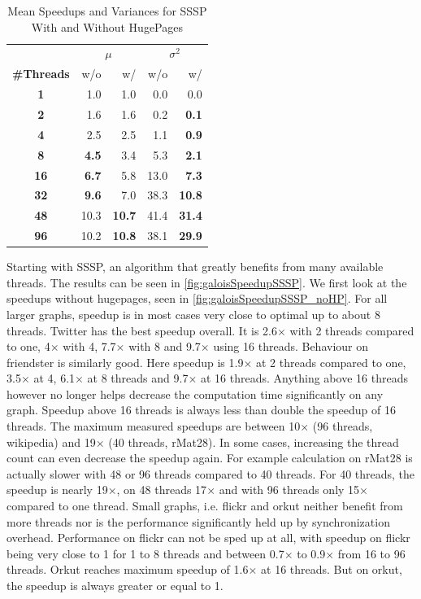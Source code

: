 \begin{table}
\renewcommand{\arraystretch}{1.3}
\centering
\caption{Mean Speedups and Variances for SSSP With and Without HugePages}
\label{tbl:ssspMeansVariances}
\begin{tabular}{c
r@{\tabskip 1 \tabcolsep}r
r@{\tabskip 1 \tabcolsep}r}
\toprule
&\multicolumn{2}{c}{\!\!\!$\mu$}&\multicolumn{2}{c}{\!\!$\sigma^2$}\\
\cmidrule(r){2-3}\cmidrule(r){4-5}
{\bf\#Threads}&w/o&w/&w/o&w/\\\midrule
\bf1 & 1.0 & 1.0 & 0.0 & 0.0 \\
\bf2 & 1.6 & 1.6 & 0.2 & \bf 0.1 \\
\bf4 & 2.5 & 2.5 & 1.1 & \bf 0.9 \\
\bf8 & \bf 4.5 & 3.4 & 5.3 & \bf 2.1 \\
\bf16 & \bf 6.7 & 5.8 & 13.0 & \bf 7.3 \\
\bf32 & \bf 9.6 & 7.0 & 38.3 & \bf 10.8 \\
\bf48 & 10.3 & \bf 10.7 & 41.4 & \bf 31.4 \\
\bf96 & 10.2 & \bf 10.8 & 38.1 & \bf 29.9 \\
\bottomrule
\end{tabular}
\end{table}

Starting with SSSP, an algorithm that greatly benefits from many available threads. The results can be seen in \autoref{fig:galoisSpeedupSSSP}.
We first look at the speedups without hugepages, seen in \autoref{fig:galoisSpeedupSSSP_noHP}.
For all larger graphs, speedup is in most cases very close to optimal up to about 8 threads.
Twitter has the best speedup overall. It is 2.6$\times$ with 2 threads compared to one, 4$\times$ with 4, 7.7$\times$ with 8 and 9.7$\times$ using 16 threads.
Behaviour on friendster is similarly good. Here speedup is 1.9$\times$ at 2 threads compared to one, 3.5$\times$ at 4, 6.1$\times$ at 8 threads and 9.7$\times$ at 16 threads.
Anything above 16 threads however no longer helps decrease the computation time significantly on any graph. Speedup above 16 threads is always less than double the speedup of 16 threads. The maximum measured speedups are between 10$\times$ (96 threads, wikipedia) and 19$\times$ (40 threads, rMat28).
In some cases, increasing the thread count can even decrease the speedup again. For example calculation on rMat28 is actually slower with 48 or 96 threads compared to 40 threads. For 40 threads, the speedup is nearly 19$\times$, on 48 threads 17$\times$ and with 96 threads only 15$\times$ compared to one thread.
Small graphs, i.e. flickr and orkut neither benefit from more threads nor is the performance significantly held up by synchronization overhead.
Performance on flickr can not be sped up at all, with speedup on flickr being very close to 1 for 1 to 8 threads and between 0.7$\times$ to 0.9$\times$ from 16 to 96 threads.
Orkut reaches maximum speedup of 1.6$\times$ at 16 threads. But on orkut, the speedup is always greater or equal to 1.

